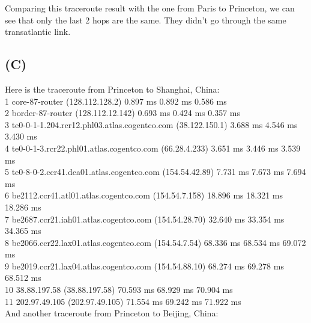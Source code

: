 \documentclass[titlepage, paper=a4, fontsize=11pt]{scrartcl} %
\numberwithin{equation}{section} %
\numberwithin{figure}{section} %
\numberwithin{table}{section} %
\begin{document}
Comparing this traceroute result with the one from Paris to Princeton, we can see that only the last 2 hops are the same. They didn't go through the same transatlantic link.

\subsection*{(C)}
Here is the traceroute from Princeton to Shanghai, China: \\

1  core-87-router (128.112.128.2)  0.897 ms  0.892 ms  0.586 ms \\
2  border-87-router (128.112.12.142)  0.693 ms  0.424 ms  0.357 ms \\
3  te0-0-1-1.204.rcr12.phl03.atlas.cogentco.com (38.122.150.1)  3.688 ms  4.546 ms  3.430 ms \\
4  te0-0-1-3.rcr22.phl01.atlas.cogentco.com (66.28.4.233)  3.651 ms  3.446 ms 3.539 ms \\
5  te0-8-0-2.ccr41.dca01.atlas.cogentco.com (154.54.42.89)  7.731 ms  7.673 ms 7.694 ms \\
6  be2112.ccr41.atl01.atlas.cogentco.com (154.54.7.158)  18.896 ms  18.321 ms  18.286 ms \\
7  be2687.ccr21.iah01.atlas.cogentco.com (154.54.28.70)  32.640 ms 33.354 ms  34.365 ms \\
8  be2066.ccr22.lax01.atlas.cogentco.com (154.54.7.54)  68.336 ms  68.534 ms 69.072 ms \\
9  be2019.ccr21.lax04.atlas.cogentco.com (154.54.88.10)  68.274 ms  69.278 ms  68.512 ms \\
10  38.88.197.58 (38.88.197.58)  70.593 ms 68.929 ms 70.904 ms \\
11  202.97.49.105 (202.97.49.105)  71.554 ms  69.242 ms  71.922 ms
\\

And another traceroute from Princeton to Beijing, China: \\
\end{document}
